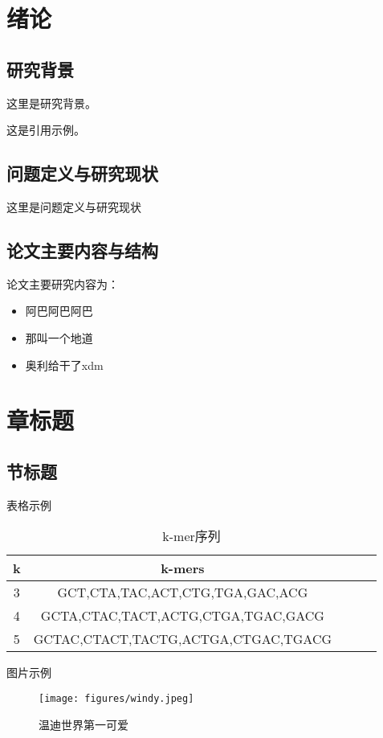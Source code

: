 
\iffalse
\fi

\setcounter{chapter}{0}
\chapter{绪论}

\section{研究背景}
这里是研究背景。

这是引用\cite{simon2011metagenomic}示例。

\section{问题定义与研究现状}
这里是问题定义与研究现状
\section{论文主要内容与结构}
\noindent
论文主要研究内容为：

\begin{itemize}
    \item 阿巴阿巴阿巴
    \item 那叫一个地道
    \item 奥利给干了xdm
\end{itemize}

\noindent

\chapter{章标题}
\section{节标题}
表格示例

\begin{table}[H]
\caption{k-mer序列}\label{tab:table1}
\vspace{0.5em}\centering\wuhao
\begin{tabular}{ccccc}
\toprule[1.5pt]
k & k-mers\\
\midrule[1pt]
3 & GCT,CTA,TAC,ACT,CTG,TGA,GAC,ACG     \\
4 & GCTA,CTAC,TACT,ACTG,CTGA,TGAC,GACG  \\
5 & GCTAC,CTACT,TACTG,ACTGA,CTGAC,TGACG \\
\bottomrule[1.5pt]
\end{tabular}
\vspace{\baselineskip}
\end{table}
图片示例
\begin{figure}[htb]
\centering
\texttt{[image: figures/windy.jpeg]}
\caption{温迪世界第一可爱}\label{fig:k-mer1}
\vspace{2em}
\end{figure}

